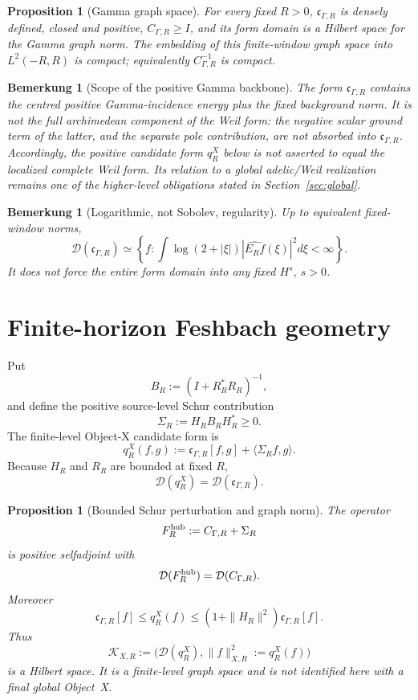 \documentclass[11pt,a4paper]{amsart}
\newtheorem{proposition}[theorem]{Proposition}
\newtheorem{remark}[theorem]{Bemerkung}
\newcommand{\KXR}[1]{\mathcal K_{X,#1}}
\begin{document}
\begin{proposition}[Gamma graph space]\label{prop:gamma}
For every fixed $R>0$, $\mathfrak c_{\Gamma,R}$ is densely defined, closed and positive,
$C_{\Gamma,R}\ge I$, and its form domain is a Hilbert space for the Gamma graph norm.
The embedding of this finite-window graph space into $L^2(-R,R)$ is compact; equivalently
$C_{\Gamma,R}^{-1}$ is compact.
\end{proposition}

\begin{remark}[Scope of the positive Gamma backbone]\label{rem:gamma-positive-scope}
The form $\mathfrak c_{\Gamma,R}$ contains the centred positive Gamma-incidence
energy plus the fixed background norm.  It is not the full archimedean
component of the Weil form: the negative scalar ground term of the latter,
and the separate pole contribution, are not absorbed into
$\mathfrak c_{\Gamma,R}$.  Accordingly, the positive candidate form
$q_R^X$ below is not asserted to equal the localized complete Weil form.
Its relation to a global adelic/Weil realization remains one of the
higher-level obligations stated in Section~\ref{sec:global}.
\end{remark}

\begin{remark}[Logarithmic, not Sobolev, regularity]\label{rem:log}
Up to equivalent fixed-window norms,
\[
 \mathcal D(\mathfrak c_{\Gamma,R})
 \simeq
 \left\{f:\int\log(2+|\xi|)|\widehat{E_Rf}(\xi)|^2d\xi<\infty\right\}.
\]
It does not force the entire form domain into any fixed $H^s$, $s>0$.
\end{remark}

\section{Finite-horizon Feshbach geometry}\label{sec:feshbach}

Put
\[
 B_R:=(I+R_R^*R_R)^{-1},
\]
and define the positive source-level Schur contribution
\[
 \Sigma_R:=H_RB_RH_R^*\ge0.
\tag{3.1}\label{eq:schur-operator}
\]
The finite-level Object-X candidate form is
\[
 \boxed{
 q_R^X(f,g)
 :=\mathfrak c_{\Gamma,R}[f,g]+\langle\Sigma_Rf,g\rangle.
 }
\tag{3.2}\label{eq:x-form}
\]
Because $H_R$ and $R_R$ are bounded at fixed $R$,
\[
 \mathcal D(q_R^X)=\mathcal D(\mathfrak c_{\Gamma,R}).
\]

\begin{proposition}[Bounded Schur perturbation and graph norm]\label{prop:bounded-schur}
The operator
\[
 F_R^{\rm hub}:=C_{\Gamma,R}+\Sigma_R
\]
is positive selfadjoint with
\[
 \mathcal D(F_R^{\rm hub})=\mathcal D(C_{\Gamma,R}).
\]
Moreover
\[
 \mathfrak c_{\Gamma,R}[f]
 \le q_R^X(f)
 \le(1+\|H_R\|^2)\mathfrak c_{\Gamma,R}[f].
\tag{3.3}\label{eq:graph-norm-equiv}
\]
Thus
\[
 \KXR{R}:=\bigl(\mathcal D(q_R^X),\|f\|_{X,R}^2:=q_R^X(f)\bigr)
\]
is a Hilbert space.  It is a finite-level graph space and is not identified here with a
final global Object~X.
\end{proposition}
\end{document}
